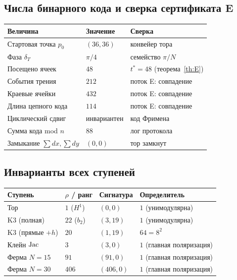 \subsection{Числа бинарного кода и сверка сертификата E}

\begin{center}
\small
\begin{tabular}{@{}l l l@{}}
\toprule
Величина & Значение & Сверка \\
\midrule
Стартовая точка $p_0$ & $(36,36)$ & конвейер тора \\
Фаза $\delta_T$ & $\pi/4$ & семейство $\pi/N$ \\
Посещено ячеек & $48$ & $t^*=48$ (теорема~\ref{th:E}) \\
События трения & $212$ & поток E: совпадение \\
Краевые ячейки & $432$ & поток E: совпадение \\
Длина цепного кода & $114$ & поток E: совпадение \\
Циклический сдвиг & инвариантен & код Фримена \\
Сумма кода mod $n$ & $88$ & лог протокола \\
Замыкание $\sum dx,\sum dy$ & $(0,0)$ & тор замкнут \\
\bottomrule
\end{tabular}
\end{center}

\subsection{Инварианты всех ступеней}

\begin{center}
\small
\begin{tabular}{@{}l l l l@{}}
\toprule
Ступень & $\rho$ / ранг & Сигнатура & Определитель \\
\midrule
Тор & $1$ ($H^1$) & $(0,0)$ & $1$ (унимодулярна) \\
K3 (полная) & $22$ ($b_2$) & $(3,19)$ & $1$ (унимодулярна) \\
K3 (прямые $+h$) & $20$ & $(1,19)$ & $64=8^2$ \\
Клейн $\operatorname{Jac}$ & $3$ & $(3,0)$ & $1$ (главная поляризация) \\
Ферма $N=15$ & $91$ & $(91,0)$ & $1$ (главная поляризация) \\
Ферма $N=30$ & $406$ & $(406,0)$ & $1$ (главная поляризация) \\
\bottomrule
\end{tabular}
\end{center}

